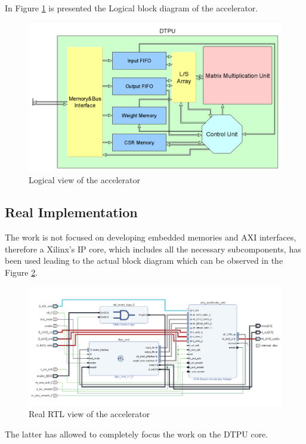 In Figure \ref{fig:logaccel} is presented the Logical block diagram of the accelerator.
\begin{figure}[!htbp]
\centering
\captionsetup{justification=centering}
\includegraphics[scale=0.30]{./figure/logical_view.png}
\caption{Logical view of the accelerator}
\label{fig:logaccel}
\end{figure}
\subsection{Real Implementation}
The work is not focused on developing embedded memories and AXI interfaces, therefore a Xilinx's IP core, which includes all the necessary subcomponents, has been used\cite{paper:43} leading to the actual block diagram which can be observed in the Figure \ref{fig:rtlaccel}.
\begin{figure}[H]
\centering
\captionsetup{justification=centering}
\includegraphics[scale=0.8,angle=0]{./figure/accelerator_schematic.png}
\caption{Real RTL view of the accelerator}
\label{fig:rtlaccel}
\end{figure} 
The latter has allowed to completely focus the work on the DTPU core.
\newpage
